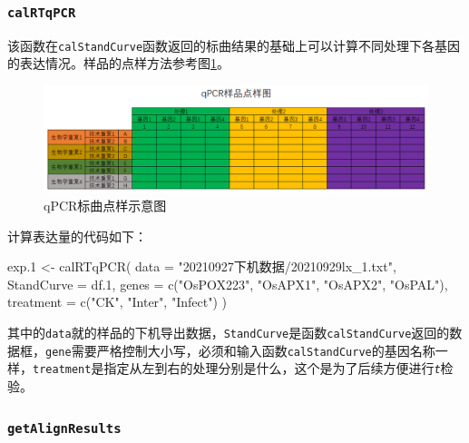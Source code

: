\documentclass[
  10pt,
]{book}
\newenvironment{Shaded}{\begin{snugshade}}{\end{snugshade}}
\newcommand{\AttributeTok}[1]{\textcolor[rgb]{0.77,0.63,0.00}{#1}}
\newcommand{\FloatTok}[1]{\textcolor[rgb]{0.00,0.00,0.81}{#1}}
\newcommand{\FunctionTok}[1]{\textcolor[rgb]{0.00,0.00,0.00}{#1}}
\newcommand{\NormalTok}[1]{#1}
\newcommand{\OtherTok}[1]{\textcolor[rgb]{0.56,0.35,0.01}{#1}}
\newcommand{\StringTok}[1]{\textcolor[rgb]{0.31,0.60,0.02}{#1}}
\begin{document}
\hypertarget{calrtqpcr}{%
\subsubsection{\texorpdfstring{\texttt{calRTqPCR}}{calRTqPCR}}\label{calrtqpcr}}

该函数在\texttt{calStandCurve}函数返回的标曲结果的基础上可以计算不同处理下各基因的表达情况。样品的点样方法参考图\ref{fig:qPCR3}。

\begin{figure}

{\centering \includegraphics[width=15.12in]{figures/pac4xiang使用说明/2} 

}

\caption{qPCR标曲点样示意图}\label{fig:qPCR3}
\end{figure}

计算表达量的代码如下：

\begin{Shaded}
\begin{Highlighting}[]
\NormalTok{exp}\FloatTok{.1} \OtherTok{\textless{}{-}} \FunctionTok{calRTqPCR}\NormalTok{(}
  \AttributeTok{data =} \StringTok{"20210927下机数据/20210929lx\_1.txt"}\NormalTok{,}
  \AttributeTok{StandCurve =}\NormalTok{ df}\FloatTok{.1}\NormalTok{,}
  \AttributeTok{genes =} \FunctionTok{c}\NormalTok{(}\StringTok{"OsPOX223"}\NormalTok{, }\StringTok{"OsAPX1"}\NormalTok{, }\StringTok{"OsAPX2"}\NormalTok{, }\StringTok{"OsPAL"}\NormalTok{),}
  \AttributeTok{treatment =} \FunctionTok{c}\NormalTok{(}\StringTok{"CK"}\NormalTok{, }\StringTok{"Inter"}\NormalTok{, }\StringTok{"Infect"}\NormalTok{)}
\NormalTok{)}
\end{Highlighting}
\end{Shaded}

其中的\texttt{data}就的样品的下机导出数据，\texttt{StandCurve}是函数\texttt{calStandCurve}返回的数据框，\texttt{gene}需要严格控制大小写，必须和输入函数\texttt{calStandCurve}的基因名称一样，\texttt{treatment}是指定从左到右的处理分别是什么，这个是为了后续方便进行\emph{\texttt{t}}检验。

\hypertarget{getalignresults}{%
\subsubsection{\texorpdfstring{\texttt{getAlignResults}}{getAlignResults}}\label{getalignresults}}
\end{document}
